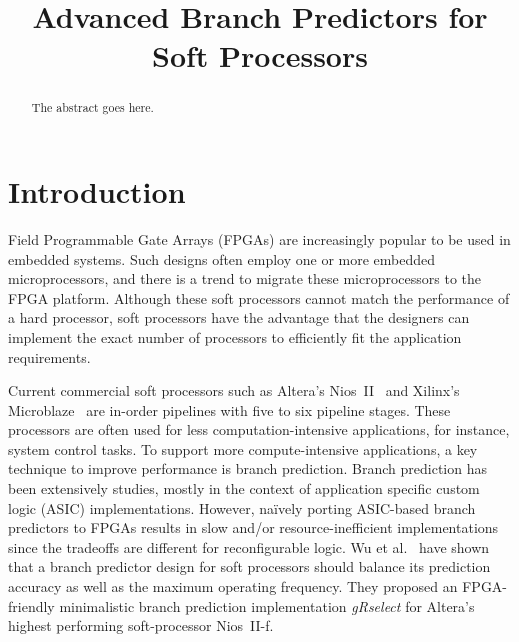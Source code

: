 \documentclass[conference]{IEEEtran}
\begin{document}
\title{Advanced Branch Predictors for Soft Processors}


\author{
}

\maketitle


\begin{abstract}
The abstract goes here.


\end{abstract}


\IEEEpeerreviewmaketitle


\section{Introduction}
\label{sec:intro}
Field Programmable Gate Arrays (FPGAs) are increasingly popular to be used in embedded systems. Such designs often employ one or more embedded microprocessors, and there is a trend to migrate these microprocessors to the FPGA platform. Although these soft processors cannot match the performance of a hard processor, soft processors have the advantage that the designers can implement the exact number of processors to efficiently fit the application requirements.

Current commercial soft processors such as Altera's Nios~II~\cite{niosii} and Xilinx's Microblaze~\cite{microblaze} are in-order pipelines with five to six pipeline stages. These processors are often used for less computation-intensive applications, for instance, system control tasks. To support more compute-intensive applications, a key technique to improve performance is branch prediction. Branch prediction has been extensively studies, mostly in the context of application specific custom logic (ASIC) implementations. However, na\"ively porting ASIC-based branch predictors to FPGAs results in slow and/or resource-inefficient implementations since the tradeoffs are different for reconfigurable logic. Wu et al.~\cite{grselect} have shown that a branch predictor design for soft processors should balance its prediction accuracy as well as the maximum operating frequency. They proposed an FPGA-friendly minimalistic branch prediction implementation \textit{gRselect} for Altera's highest performing soft-processor Nios~II-f.
\end{document}
